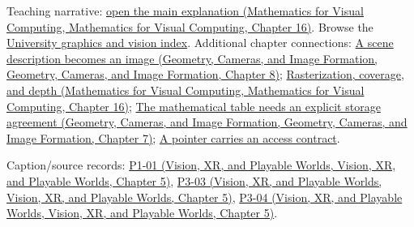 Teaching narrative: \href{../02-Mathematics-for-Visual-Computing/main.pdf\#nameddest=03-visual-computing-i-ch012-rasterization-coverage-and-depth}{open the main explanation (Mathematics for Visual Computing, Mathematics for Visual Computing, Chapter 16)}. Browse the \hyperref[appendix-a6d556a4ef50-university-graphics-vision-and-photography---independent-series]{University graphics and vision index}. Additional chapter connections: \href{../03-Geometry-Cameras-and-Image-Formation/main.pdf\#nameddest=03-visual-computing-i-ch001-a-scene-description-becomes-an-image}{A scene description becomes an image (Geometry, Cameras, and Image Formation, Geometry, Cameras, and Image Formation, Chapter 8)}; \href{../02-Mathematics-for-Visual-Computing/main.pdf\#nameddest=03-visual-computing-i-ch012-rasterization-coverage-and-depth}{Rasterization, coverage, and depth (Mathematics for Visual Computing, Mathematics for Visual Computing, Chapter 16)}; \href{../03-Geometry-Cameras-and-Image-Formation/main.pdf\#nameddest=02-foundations-ii-ch038-the-mathematical-table-needs-an-explicit-storage-agreement}{The mathematical table needs an explicit storage agreement (Geometry, Cameras, and Image Formation, Geometry, Cameras, and Image Formation, Chapter 7)}; \hyperref[01-foundations-i-ch003-a-pointer-carries-an-access-contract]{A pointer carries an access contract}.

Caption/source records: \href{../07-Vision-XR-and-Playable-Worlds/main.pdf\#nameddest=04-visual-computing-ii-ch036-p1-01---module-1.1-course-intro-administrivia-part-1-graphics-visual-computing-2026}{P1-01 (Vision, XR, and Playable Worlds, Vision, XR, and Playable Worlds, Chapter 5)}, \href{../07-Vision-XR-and-Playable-Worlds/main.pdf\#nameddest=04-visual-computing-ii-ch036-p3-03---moving-objects-in-space}{P3-03 (Vision, XR, and Playable Worlds, Vision, XR, and Playable Worlds, Chapter 5)}, \href{../07-Vision-XR-and-Playable-Worlds/main.pdf\#nameddest=04-visual-computing-ii-ch036-p3-04---rotations-about-an-arbitrary-axis}{P3-04 (Vision, XR, and Playable Worlds, Vision, XR, and Playable Worlds, Chapter 5)}.

